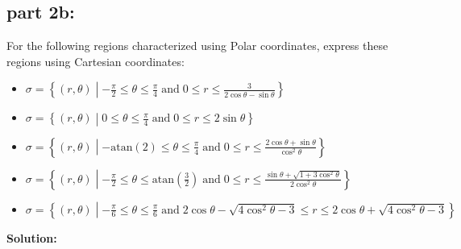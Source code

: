 \documentclass{article}
\newcommand{\atan}{\text{atan}}
\newcommand{\dr}[1]{\textcolor{dark_red}{#1}}
\begin{document}
\subsection*{part 2b:} 

For the following regions characterized using Polar coordinates, express these regions using Cartesian coordinates:

\begin{itemize}
\item \(\sigma = \left\{(r,\theta) \middle| -\frac{\pi}{2} \leq \theta \leq \frac{\pi}{4} \;\text{and}\; 0 \leq r \leq \frac{3}{2\cos\theta - \sin\theta}\right\}\)
\item \(\sigma = \left\{(r,\theta) \middle| 0 \leq \theta \leq \frac{\pi}{4} \;\text{and}\; 0 \leq r \leq 2\sin\theta\right\}\)
\item \(\sigma = \left\{(r,\theta) \middle| -\atan(2) \leq \theta \leq \frac{\pi}{4} \;\text{and}\; 0 \leq r \leq \frac{2\cos\theta + \sin\theta}{\cos^2\theta}\right\}\) 
\item \(\sigma = \left\{(r,\theta) \middle| -\frac{\pi}{2} \leq \theta \leq \atan(\frac{3}{2}) \;\text{and}\; 0 \leq r \leq \frac{\sin\theta + \sqrt{1 + 3\cos^2\theta}}{2\cos^2\theta}\right\}\)
\item \(\sigma = \left\{(r,\theta) \middle| -\frac{\pi}{6} \leq \theta \leq \frac{\pi}{6} \;\text{and}\; 2\cos\theta - \sqrt{4\cos^2\theta - 3} \leq r \leq 2\cos\theta + \sqrt{4\cos^2\theta - 3}\right\}\)
\end{itemize}

\vspace{5mm}
\dr{\textbf{Solution:}}

\pagebreak
\end{document}
